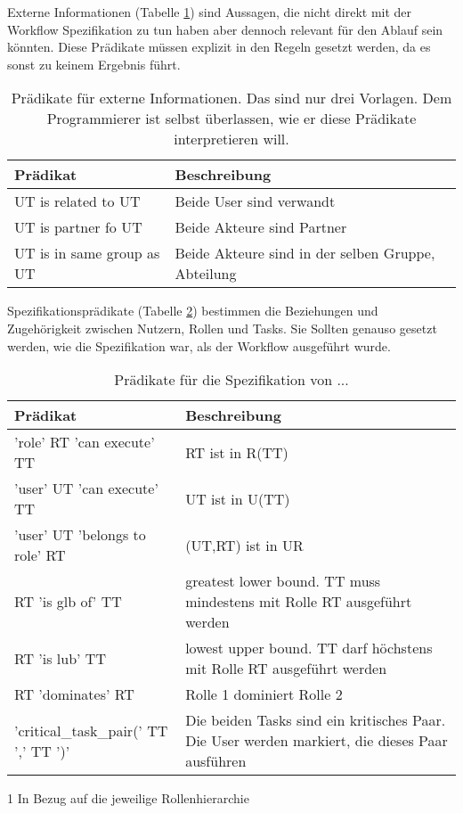Externe Informationen (Tabelle \ref{tab:extern}) sind Aussagen, die nicht direkt mit der Workflow Spezifikation zu tun haben aber dennoch relevant für den Ablauf sein könnten. Diese Prädikate müssen explizit in den Regeln gesetzt werden, da es sonst zu keinem Ergebnis führt.
\begin{table}[h]
\begin{tabular} {|p{6cm}|p{10cm}|}
\hline
\textbf{Prädikat} & \textbf{Beschreibung}\\
\hline
UT is related to UT 		& Beide User sind verwandt \\
\hline
UT is partner fo UT		& Beide Akteure sind Partner \\
\hline
UT is in same group as UT	& Beide Akteure sind in der selben Gruppe, Abteilung\\
\hline
\end{tabular}
\caption{Prädikate für externe Informationen. Das sind nur drei Vorlagen. Dem Programmierer ist selbst überlassen, wie er diese Prädikate interpretieren will.}
\label{tab:extern}
\end{table}

Spezifikationsprädikate (Tabelle \ref{tab:specification}) bestimmen die Beziehungen und Zugehörigkeit zwischen Nutzern, Rollen und Tasks. Sie Sollten genauso gesetzt werden, wie die Spezifikation war, als der Workflow ausgeführt wurde.
\begin{table}[h]
\begin{tabular} {|p{6cm}|p{10cm}|}
\hline
\textbf{Prädikat} & \textbf{Beschreibung}\\
\hline
'role' RT 'can execute' TT	& RT ist in  R(TT)\\
\hline
'user' UT 'can execute' TT 	& UT ist in U(TT)\\
\hline
'user' UT 'belongs to role' RT  & (UT,RT) ist in UR\\
\hline
RT 'is glb of' TT 		& greatest lower bound. TT muss mindestens mit Rolle RT ausgeführt werden\tnote{1}\\
\hline
RT 'is lub' TT 			& lowest upper bound. TT darf höchstens mit Rolle RT ausgeführt werden\tnote{1}\\
\hline
RT 'dominates' RT 		& Rolle 1 dominiert Rolle 2\tnote{1}\\
\hline
'critical{\_}task{\_}pair(' TT ',' TT ')'& Die beiden Tasks sind ein kritisches Paar. Die User werden markiert, die dieses Paar ausführen\\
\hline
\end{tabular}
\begin{tablenotes}\footnotesize 
\item[1] In Bezug auf die jeweilige Rollenhierarchie 
\end{tablenotes}
\caption{Prädikate für die Spezifikation von ...}
\label{tab:specification}
\end{table}

